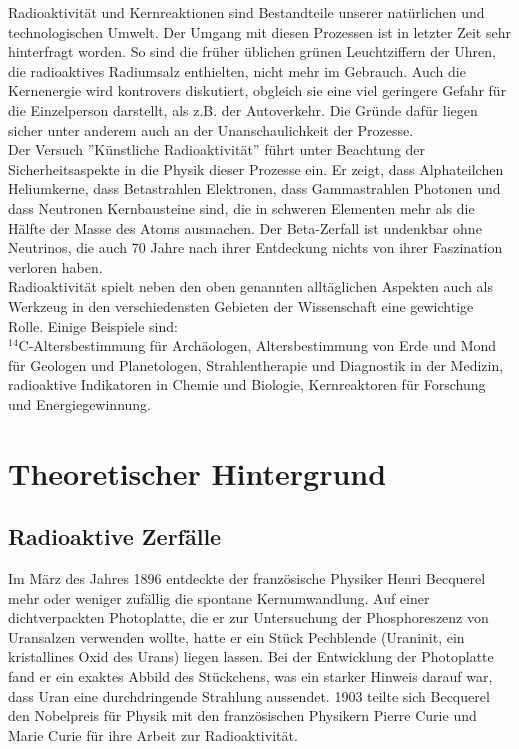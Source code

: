 Radioaktivität und Kernreaktionen sind Bestandteile unserer natürlichen und technologischen Umwelt. Der Umgang mit diesen Prozessen ist in letzter Zeit sehr hinterfragt worden. So sind die früher üblichen grünen Leuchtziffern der Uhren, die radioaktives Radiumsalz enthielten, nicht mehr im Gebrauch. Auch die Kernenergie wird kontrovers diskutiert, obgleich sie eine viel geringere Gefahr für die Einzelperson darstellt, als z.B. der Autoverkehr. Die Gründe dafür liegen sicher unter anderem auch an der Unanschaulichkeit der Prozesse.\\
Der Versuch ''Künstliche Radioaktivität'' führt unter Beachtung der Sicherheitsaspekte in die Physik dieser Prozesse ein. Er zeigt, dass Alphateilchen Heliumkerne, dass Betastrahlen Elektronen, dass Gammastrahlen Photonen und dass Neutronen Kernbausteine sind, die in schweren Elementen mehr als die Hälfte der Masse des Atoms ausmachen. Der Beta-Zerfall ist undenkbar ohne Neutrinos, die auch 70 Jahre nach ihrer Entdeckung nichts von ihrer Faszination verloren haben.\\

\noindent
Radioaktivität spielt neben den oben genannten alltäglichen Aspekten auch als Werkzeug in den verschiedensten Gebieten der Wissenschaft eine gewichtige Rolle. Einige Beispiele sind:\\
$^{14}$C-Altersbestimmung für Archäologen, Altersbestimmung von Erde und Mond für Geologen und Planetologen, Strahlentherapie und Diagnostik in der Medizin, radioaktive Indikatoren in Chemie und Biologie, Kernreaktoren für Forschung und Energiegewinnung.

\section{Theoretischer Hintergrund}

\subsection{Radioaktive Zerfälle}

Im März des Jahres 1896 entdeckte der französische Physiker Henri Becquerel mehr oder weniger zufällig die spontane Kernumwandlung. Auf einer dichtverpackten Photoplatte, die er zur Untersuchung der Phosphoreszenz von Uransalzen verwenden wollte, hatte er ein Stück Pechblende (Uraninit, ein kristallines Oxid des Urans) liegen lassen. Bei der Entwicklung der Photoplatte fand er ein exaktes Abbild des Stückchens, was ein starker Hinweis darauf war, dass Uran eine durchdringende Strahlung aussendet. 1903 teilte sich Becquerel den Nobelpreis für Physik mit den französischen Physikern Pierre Curie und Marie Curie für ihre Arbeit zur Radioaktivität.\\

